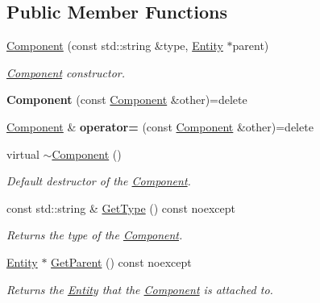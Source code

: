 \subsection*{Public Member Functions}
\begin{DoxyCompactItemize}
\item 
\hyperlink{class_blade_1_1_component_a9afd6318db086a2fa6bfdbbbc009ef85}{Component} (const std\+::string \&type, \hyperlink{class_blade_1_1_entity}{Entity} $\ast$parent)
\begin{DoxyCompactList}\small\item\em \hyperlink{class_blade_1_1_component}{Component} constructor. \end{DoxyCompactList}\item 
\mbox{\label{class_blade_1_1_component_a8f82f850d6487c061112513171a3ebe2}} 
{\bfseries Component} (const \hyperlink{class_blade_1_1_component}{Component} \&other)=delete
\item 
\mbox{\label{class_blade_1_1_component_abbed7271dc6e5d937a6a1fd0135a8614}} 
\hyperlink{class_blade_1_1_component}{Component} \& {\bfseries operator=} (const \hyperlink{class_blade_1_1_component}{Component} \&other)=delete
\item 
\mbox{\label{class_blade_1_1_component_abeec5b76a9868647abb96b7f575d9e11}} 
virtual \hyperlink{class_blade_1_1_component_abeec5b76a9868647abb96b7f575d9e11}{$\sim$\+Component} ()
\begin{DoxyCompactList}\small\item\em Default destructor of the \hyperlink{class_blade_1_1_component}{Component}. \end{DoxyCompactList}\item 
const std\+::string \& \hyperlink{class_blade_1_1_component_a0ad0c264894e64c7b336c12165b6beac}{Get\+Type} () const noexcept
\begin{DoxyCompactList}\small\item\em Returns the type of the \hyperlink{class_blade_1_1_component}{Component}. \end{DoxyCompactList}\item 
\hyperlink{class_blade_1_1_entity}{Entity} $\ast$ \hyperlink{class_blade_1_1_component_aadb58e9f58725b7022ee672124bc1518}{Get\+Parent} () const noexcept
\begin{DoxyCompactList}\small\item\em Returns the \hyperlink{class_blade_1_1_entity}{Entity} that the \hyperlink{class_blade_1_1_component}{Component} is attached to. \end{DoxyCompactList}\item 

\end{DoxyCompactItemize}
